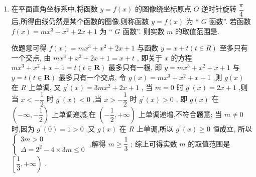 \begin{enumerate}
    \item 在平面直角坐标系中,将函数 $y = f\left( x\right)$ 的图像绕坐标原点 $O$ 逆时针旋转 $\dfrac{\pi }{4}$ 后,所得曲线仍然是某个函数的图像,则称函数 $y = f\left( x\right)$ 为 “ $G$ 函数”. 若函数 $f\left( x\right)  = m{x}^{3} + {x}^{2} + {2x} + 1$ 为 “ $G$ 函数”. 则实数 $m$ 的取值范围是.
    \begin{jieda}
        依题意可得 $f\left( x\right)  = m{x}^{3} + {x}^{2} + {2x} + 1$ 与函数 $y = x + t\left( {t \in  {R}}\right)$ 至多只有一个交点,
        由 $m{x}^{3} + {x}^{2} + {2x} + 1 = x + t$ ,
        即关于 $x$ 的方程 $m{x}^{3} + {x}^{2} + x + 1 = t\left( {t \in  \mathbf{R}}\right)$ 最多只有一根,
        即 $y = m{x}^{3} + {x}^{2} + x + 1$ 与 $y = t\left( {t \in  \mathbf{R}}\right)$ 最多只有一个交点,
        令 $g\left( x\right)  = m{x}^{3} + {x}^{2} + x + 1$ ,则 $g\left( x\right)$ 在 ${R}$ 上单调,
        又 ${g}^{\prime }\left( x\right)  = {3m}{x}^{2} + {2x} + 1$ ,
        当 $m = 0$ 时 ${g}^{\prime }\left( x\right)  = {2x} + 1$ ,则当 $x <  - \dfrac{1}{2}$ 时 ${g}^{\prime }\left( x\right)  < 0$ ,当 $x >  - \dfrac{1}{2}$ 时 ${g}^{\prime }\left( x\right)  > 0$ ,
        即 $g\left( x\right)$ 在 $\left( {-\infty , - \dfrac{1}{2}}\right)$ 上单调递减,在 $\left( {-\dfrac{1}{2}, + \infty }\right)$ 上单调递增,不符合题意;
        当 $m \neq  0$ 时,因为 ${g}^{\prime }\left( 0\right)  = 1 > 0$ ,又 $g\left( x\right)$ 在 ${R}$ 上单调,所以 ${g}^{\prime }\left( x\right)  \geq  0$ 恒成立,
        所以 $\left\{  \begin{array}{l} {3m} > 0 \\  \Delta  = {2}^{2} - 4 \times  {3m} \leq  0 \end{array}\right.$ ,解得 $m \geq  \dfrac{1}{3}$ ;
        综上可得实数 $m$ 的取值范围是 $\left\lbrack  {\dfrac{1}{3}, + \infty }\right)$ .
    \end{jieda}
\end{enumerate}
